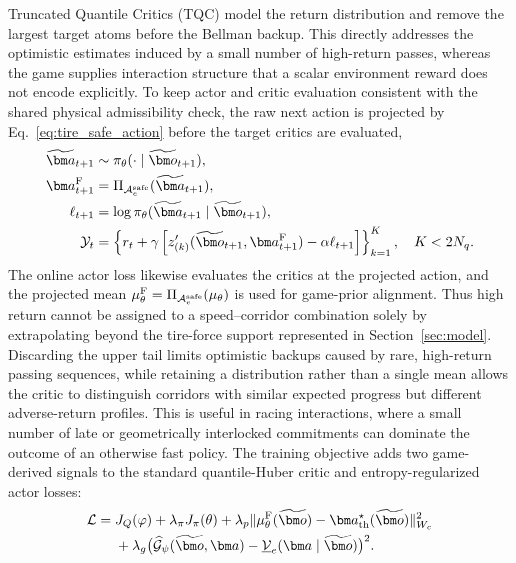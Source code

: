 Truncated Quantile Critics (TQC) model the return distribution and remove the
largest target atoms before the Bellman backup. This directly addresses the
optimistic estimates induced by a small number of high-return passes, whereas
the game supplies interaction structure that a scalar environment reward does
not encode explicitly. To keep actor and critic evaluation consistent with the
shared physical admissibility check, the raw next action is projected by
Eq.~\eqref{eq:tire_safe_action} before the target critics are evaluated,
\begin{equation}
\begin{aligned}
\widetilde{\bm a}_{t+1}&\sim
\pi_\theta(\cdot\mid\widetilde{\bm o}_{t+1}),\\
\bm a_{t+1}^{\rm F}&=\Pi_{\mathcal A_e^{\rm safe}}
(\widetilde{\bm a}_{t+1}),\\
\ell_{t+1}&=\log\pi_\theta(\widetilde{\bm a}_{t+1}
\mid\widetilde{\bm o}_{t+1}),\\
\mathcal Y_t&=\left\{r_t+\gamma\left[
z_{(k)}'(\widetilde{\bm o}_{t+1},\bm a_{t+1}^{\rm F})
-\alpha\ell_{t+1}\right]\right\}_{k=1}^{K},\quad K<2N_q .
\end{aligned}
\label{eq:tqc_truncated_target}
\end{equation}
The online actor loss likewise evaluates the critics at the projected action,
and the projected mean $\mu_\theta^{\rm F}=\Pi_{\mathcal A_e^{\rm safe}}
(\mu_\theta)$ is used for game-prior alignment.  Thus high return cannot be
assigned to a speed--corridor combination solely by extrapolating beyond the
tire-force support represented in Section~\ref{sec:model}.
Discarding the upper tail limits optimistic backups caused by rare, high-return
passing sequences, while retaining a distribution rather than a single mean
allows the critic to distinguish corridors with similar expected progress but
different adverse-return profiles.  This is useful in racing interactions,
where a small number of late or geometrically interlocked commitments can
dominate the outcome of an otherwise fast policy.  The training objective adds
two game-derived signals to the standard quantile-Huber critic and
entropy-regularized actor losses:
\begin{equation}
\begin{aligned}
\mathcal L={}&J_Q(\varphi)+\lambda_\pi J_\pi(\theta)
 +\lambda_p\|\mu_\theta^{\rm F}(\widetilde{\bm o})-
 \bm a_{\rm th}^{\star}(\widetilde{\bm o})\|_{W_c}^{2}\\
&+\lambda_g\bigl(\widehat{\mathcal G}_\psi(\widetilde{\bm o},\bm a)
-\underline{\mathcal V}_e(\bm a\mid\widetilde{\bm o})\bigr)^2 .
\end{aligned}
\label{eq:total_loss}
\end{equation}
